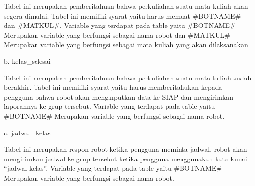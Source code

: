 \documentclass{article}
\begin{document}
            \par Tabel ini merupakan pemberitahuan bahwa perkuliahan suatu mata kuliah akan segera dimulai. Tabel ini memiliki syarat yaitu harus memuat #BOTNAME# dan #MATKUL#. Variable yang terdapat pada table yaitu #BOTNAME# Merupakan variable yang berfungsi sebagai nama robot dan #MATKUL# Merupakan variable yang berfungsi sebagai mata kuliah yang akan dilaksanakan
            \newline
        \item b. kelas\_selesai
            \newline
            \par Tabel ini merupakan pemberitahuan bahwa perkuliahan suatu mata kuliah sudah berakhir. Tabel ini memiliki syarat yaitu harus memberitahukan kepada pengguna bahwa robot akan menginputkan data ke SIAP dan mengirimkan laporannya ke grup tersebut. Variable yang terdapat pada table yaitu #BOTNAME# Merupakan variable yang berfungsi sebagai nama robot.
            \newline
        \item c. jadwal\_kelas
            \newline
            \par Tabel ini merupakan respon robot ketika pengguna meminta jadwal. robot akan mengirimkan jadwal ke grup tersebut ketika pengguna menggunakan kata kunci “jadwal kelas”. Variable yang terdapat pada table yaitu #BOTNAME# Merupakan variable yang berfungsi sebagai nama robot.
            \newline
\end{document}
